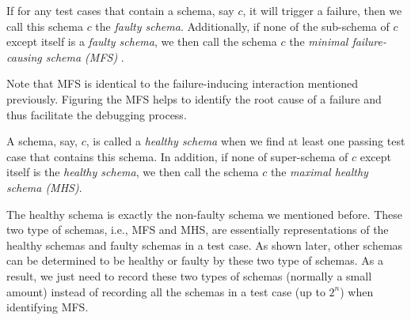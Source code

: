 \begin{definition} \label{de:faulty:minimal}
If for any test cases that contain a schema, say $c$, it will trigger a failure, then we call this schema $c$ the \emph{faulty schema}. Additionally, if none of the sub-schema of $c$  except itself is a \emph{faulty schema}, we then call the schema $c$ the \emph{minimal failure-causing schema (MFS)} \cite{nie2011minimal}.

\end{definition}

Note that MFS is identical to the failure-inducing interaction mentioned previously. %
Figuring the MFS helps to identify the root cause of a failure and thus facilitate the debugging process.


\begin{definition}\label{de:healthy:maximal}
A schema, say, $c$, is called a \emph{healthy schema} when we find at least one passing test case that contains this schema. In addition, if none of super-schema of $c$ except itself is the \emph{healthy schema}, we then call the schema $c$ the \emph{maximal healthy schema (MHS)}.
\end{definition}

The healthy schema is exactly the non-faulty schema we mentioned before. These two type of schemas, i.e., MFS and MHS, are essentially representations of the healthy schemas and faulty schemas in a test case. As shown later, other schemas can be determined to be healthy or faulty by these two type of schemas. As a result, we just need to record these two types of schemas (normally a small amount) instead of recording all the schemas in a test case (up to $2^{n}$) when identifying MFS.




%


